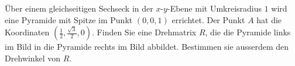 Über einem gleichseitigen Sechseck in der $x$-$y$-Ebene mit Umkreisradius $1$ 
wird eine Pyramide mit Spitze im Punkt $(0,0,1)$ errichtet.
Der Punkt $A$ hat die Koordinaten $(\frac12,\frac{\sqrt{3}}2,0)$.
Finden Sie eine Drehmatrix $R$, die die Pyramide links im Bild in die
Pyramide rechts im Bild abbildet.
Bestimmen sie ausserdem den Drehwinkel von $R$.

\begin{center}
\end{center}


